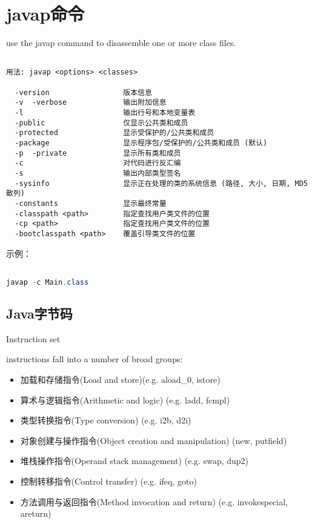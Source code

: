 \section{javap命令}
\label{chap:tools_javap}

use the javap command to disassemble one or more class files.

\begin{lstlisting}[language=cshell]

用法: javap <options> <classes>

  -version                 版本信息
  -v  -verbose             输出附加信息
  -l                       输出行号和本地变量表
  -public                  仅显示公共类和成员
  -protected               显示受保护的/公共类和成员
  -package                 显示程序包/受保护的/公共类和成员 (默认)
  -p  -private             显示所有类和成员
  -c                       对代码进行反汇编
  -s                       输出内部类型签名
  -sysinfo                 显示正在处理的类的系统信息 (路径, 大小, 日期, MD5 散列)
  -constants               显示最终常量
  -classpath <path>        指定查找用户类文件的位置
  -cp <path>               指定查找用户类文件的位置
  -bootclasspath <path>    覆盖引导类文件的位置

\end{lstlisting}

示例：

\begin{lstlisting}[language=java]

javap -c Main.class

\end{lstlisting}

\subsection{Java字节码} 

Instruction set 


instructions fall into a number of broad groups:

\begin{itemize}
    \item 加载和存储指令(Load and store)(e.g. aload\_0, istore)
    \item 算术与逻辑指令(Arithmetic and logic) (e.g. ladd, fcmpl)
    \item 类型转换指令(Type conversion) (e.g. i2b, d2i)
    \item 对象创建与操作指令(Object creation and manipulation) (new, putfield)
    \item 堆栈操作指令(Operand stack management) (e.g. swap, dup2)
    \item 控制转移指令(Control transfer) (e.g. ifeq, goto)
    \item 方法调用与返回指令(Method invocation and return) (e.g. invokespecial, areturn)
\end{itemize}

